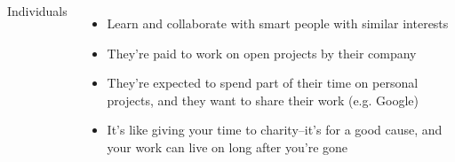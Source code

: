 \documentclass{beamer}
\begin{document}
\begin{frame}
\begin{columns}
    \begin{Large}Individuals\end{Large}
    \begin{itemize}
    \item Learn and collaborate with smart people with similar interests
    \item They're paid to work on open projects by their company
    \item They're expected to spend part of their time on personal projects, and they want to share their work (e.g. Google)
    \item It's like giving your time to charity--it's for a good cause, and your work can live on long after you're gone
    \end{itemize}
  \end{columns}
\end{frame}




\end{document}
